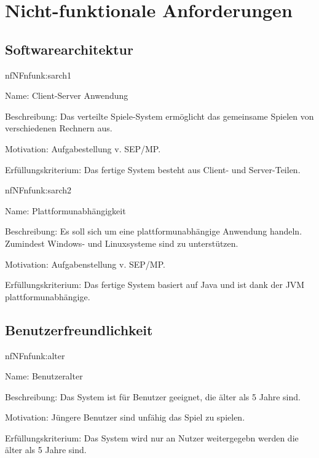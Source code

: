 \chapter{Nicht-funktionale Anforderungen}

\setcounter{nf}{10}

\section{Softwarearchitektur}

\begin{description}[leftmargin=5em, style=sameline]	
	\begin{lhp}{nf}{NF}{nfunk:sarch1}
		\item [Name:] Client-Server Anwendung
		\item [Beschreibung:] Das verteilte Spiele-System ermöglicht das gemeinsame Spielen von verschiedenen Rechnern aus.
		\item [Motivation:] Aufgabestellung v. SEP/MP.
		\item [Erfüllungskriterium:] Das fertige System besteht aus Client- und Server-Teilen.
	\end{lhp}
	
	\begin{lhp}{nf}{NF}{nfunk:sarch2}
		\item [Name:] Plattformunabhängigkeit
		\item [Beschreibung:] Es soll sich um eine plattformunabhängige Anwendung handeln. Zumindest Windows- und Linuxsysteme sind zu unterstützen.
		\item [Motivation:] Aufgabenstellung v. SEP/MP.
		\item [Erfüllungskriterium:] Das fertige System basiert auf Java und ist dank der JVM
		                             plattformunabhängige.
	\end{lhp}
\end{description}



\section{Benutzerfreundlichkeit}


\begin{description}[leftmargin=5em, style=sameline]	
	\begin{lhp}{nf}{NF}{nfunk:alter}
		\item [Name:] Benutzeralter
		\item [Beschreibung:] Das System ist für Benutzer geeignet, die älter als 5 Jahre sind.
		\item [Motivation:] Jüngere Benutzer sind unfähig das Spiel zu spielen.
		\item [Erfüllungskriterium:] Das System wird nur an Nutzer weitergegebn werden die älter als 5 Jahre sind.
	\end{lhp}
\end{description}

